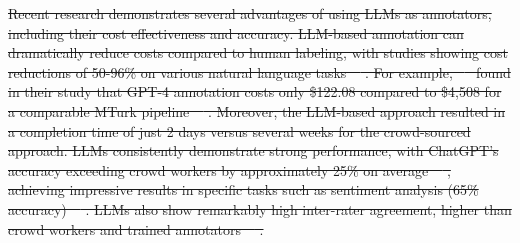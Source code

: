 \documentclass[smallextended]{svjour3}
\newcommand{\studytypeparagraph}[1]{\paragraph{\bfseries #1:}}
\providecommand{\DIFdeltex}[1]{{\protect\color{red}\sout{#1}}}                      %
\providecommand{\DIFdelbegin}{} %
\providecommand{\DIFdel}[1]{\texorpdfstring{\DIFdeltex{#1}}{}} %
\newcommand{\DIFscaledelfig}{0.5}
\newlength{\DIFdelgraphicswidth} %
\newlength{\DIFdelgraphicsheight} %
\newcommand{\DIFdelincludegraphics}[2][]{%
\sbox{\DIFdelgraphicsbox}{\DIFOincludegraphics[#1]{#2}}%
\settoboxwidth{\DIFdelgraphicswidth}{\DIFdelgraphicsbox} %
\settoboxtotalheight{\DIFdelgraphicsheight}{\DIFdelgraphicsbox} %
\scalebox{\DIFscaledelfig}{%
\parbox[b]{\DIFdelgraphicswidth}{\usebox{\DIFdelgraphicsbox}\\[-\baselineskip] \rule{\DIFdelgraphicswidth}{0em}}\llap{\resizebox{\DIFdelgraphicswidth}{\DIFdelgraphicsheight}{%
\setlength{\unitlength}{\DIFdelgraphicswidth}%
\begin{picture}(1,1)%
\thicklines\linethickness{2pt} %
{\color[rgb]{1,0,0}\put(0,0){\framebox(1,1){}}}%
{\color[rgb]{1,0,0}\put(0,0){\line( 1,1){1}}}%
{\color[rgb]{1,0,0}\put(0,1){\line(1,-1){1}}}%
\end{picture}%
}\hspace*{3pt}}} %
} %
\DeclareRobustCommand{\DIFdelbegin}{\DIFOdelbegin \let\includegraphics\DIFdelincludegraphics} %
\begin{document}
\DIFdelbegin %
\DIFdel{Recent research demonstrates several advantages of using LLMs as annotators, including their cost effectiveness and accuracy.
LLM-based annotation can dramatically reduce costs compared to human labeling, with studies showing cost reductions of 50-96\% on various natural language tasks~\mbox{%
\cite{DBLP:conf/emnlp/WangLXZZ21}}\hskip0pt%
.
For example, \mbox{%
\citeauthor{DBLP:conf/chi/HeHDRH24} }\hskip0pt%
found in their study that GPT-4 annotation costs only \$122.08 compared to \$4,508 for a comparable MTurk pipeline~\mbox{%
\cite{DBLP:conf/chi/HeHDRH24}}\hskip0pt%
.
Moreover, the LLM-based approach resulted in a completion time of just 2 days versus several weeks for the crowd-sourced approach.
LLMs consistently demonstrate strong performance, with ChatGPT's accuracy exceeding crowd workers by approximately 25\% on average~\mbox{%
\cite{DBLP:journals/corr/abs-2303-15056}}\hskip0pt%
, achieving impressive results in specific tasks such as sentiment analysis (65\% accuracy)~\mbox{%
\cite{DBLP:journals/corr/abs-2304-10145}}\hskip0pt%
.
LLMs also show remarkably high inter-rater agreement, higher than crowd workers and trained annotators~\mbox{%
\cite{DBLP:journals/corr/abs-2303-15056}}\hskip0pt%
.
}%
\end{document}
